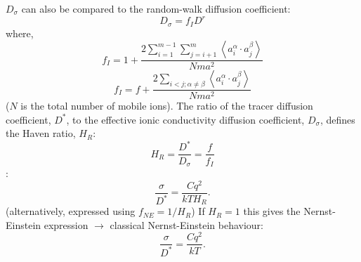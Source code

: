 \documentclass[aps,prl,twocolumn,superscriptaddress,reprint]{revtex4-1}
\begin{document}
$D_\sigma$ can also be compared to the random-walk diffusion coefficient:
\begin{equation}
  D_\sigma = f_I D^r
\end{equation}
where,
\begin{equation}
  f_I = 1 + \frac{
    2\displaystyle\sum_{i=1}^{m-1}\sum_{j=i+1}^{m}\left<a_i^\alpha \cdot a_j^\beta\right>
  }{
    Nma^2
  }
\end{equation}
\begin{equation}
  f_I = f + \frac{
    2\displaystyle\sum_{i<j;\alpha\neq\beta}\left<a_i^\alpha \cdot a_j^\beta\right>
  }{
    Nma^2
  }
\end{equation}
($N$ is the total number of mobile ions).
The ratio of the tracer diffusion coefficient, $D^*$, to the effective ionic conductivity diffusion coefficient, $D_\sigma$, defines the Haven ratio, $H_R$:
\begin{equation}
  H_R = \frac{D^*}{D_\sigma} = \frac{f}{f_I}
\end{equation}
:
\begin{equation}
   \frac{\sigma}{D^*} = \frac{Cq^2}{kTH_R}.
 \end{equation}
 (alternatively, expressed using $f_{NE}=1/H_R$) 
 If $H_R=1$ this gives the Nernst-Einstein expression $\to$ classical Nernst-Einstein behaviour:
 \begin{equation}
   \frac{\sigma}{D^*} = \frac{Cq^2}{kT}.
 \end{equation}


\end{document}
